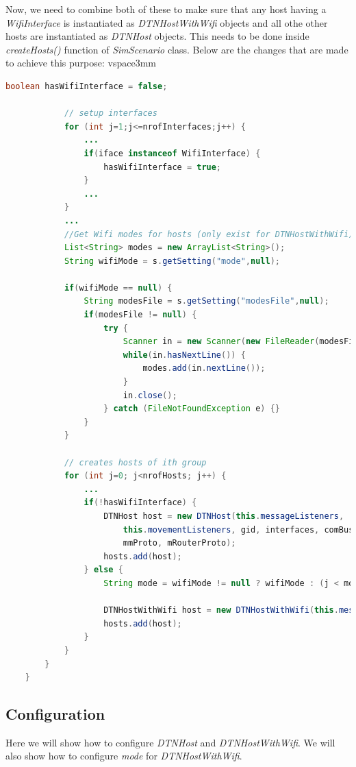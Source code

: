 Now, we need to combine both of these to make sure that any host having a \textit{WifiInterface} is instantiated as \textit{DTNHostWithWifi} objects and all othe other hosts are instantiated as \textit{DTNHost} objects. This needs to be done inside \textit{createHosts()} function of \textit{SimScenario} class. Below are the changes that are made to achieve this purpose:
vspace{3mm}
\begin{lstlisting}[language=java]
			boolean hasWifiInterface = false;
			
			// setup interfaces
			for (int j=1;j<=nrofInterfaces;j++) {
				...
				if(iface instanceof WifiInterface) {
					hasWifiInterface = true;
				}
				...
			}
			...
			//Get Wifi modes for hosts (only exist for DTNHostWithWifi)
			List<String> modes = new ArrayList<String>();
			String wifiMode = s.getSetting("mode",null);

			if(wifiMode == null) {
				String modesFile = s.getSetting("modesFile",null);
				if(modesFile != null) {
					try {
						Scanner in = new Scanner(new FileReader(modesFile));
						while(in.hasNextLine()) {
							modes.add(in.nextLine());
						}
						in.close();
					} catch (FileNotFoundException e) {}
				}
			}
			
			// creates hosts of ith group
			for (int j=0; j<nrofHosts; j++) {
				...
				if(!hasWifiInterface) {
					DTNHost host = new DTNHost(this.messageListeners, 
						this.movementListeners,	gid, interfaces, comBus, 
						mmProto, mRouterProto);
					hosts.add(host);
				} else {
					String mode = wifiMode != null ? wifiMode : (j < modes.size() ? modes.get(j) : "");
				
					DTNHostWithWifi host = new DTNHostWithWifi(this.messageListeners, this.movementListeners, gid, interfaces, comBus, mmProto, mRouterProto,  mode: mode);
					hosts.add(host);
				}
			}
		}
	}
\end{lstlisting}
\subsection{Configuration}
Here we will show how to configure \textit{DTNHost} and \textit{DTNHostWithWifi}. We will also show how to configure \textit{mode} for \textit{DTNHostWithWifi}.

